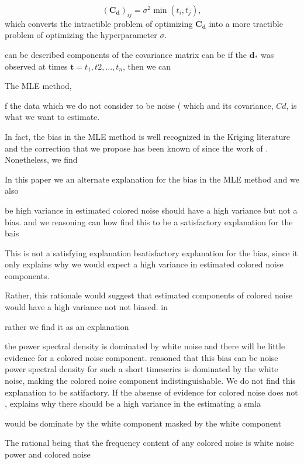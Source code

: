 \documentclass[10pt,a4paper]{article}
\begin{document}
\begin{equation}\label{RandomWalk}
  (\mathbf{C_d})_{ij} = \sigma^2\min(t_i,t_j),
\end{equation}
which converts the intractible problem of optimizing $\mathbf{C_d}$ into a more tractible problem of optimizing the hyperparameter $\sigma$. 

can be described  components of the covariance matrix can be   if the $\mathbf{d_*}$ was observed at times $\mathbf{t} = {t_1,t2,...,t_n}$, then we can      

The MLE method, 

  f the data which we do not consider to be noise ( which     and its covariance, $Cd$, is what we want to estimate.  

In fact, the bias in the MLE method is well recognized in the Kriging literature \citep[e.g][]{Cressie1992} and the correction that we propose has been known of since the work of \citet{Patterson1971}. Nonetheless, we find         

In this paper we an alternate explanation for the bias in the MLE method and we also     

be high variance in estimated colored noise should have a high variance but not a bias.   and we reasoning can how find this to be a satisfactory explanation for the bais

This is not a satisfying explanation bsatisfactory explanation for the bias, since it only explains why we would expect a high variance in estimated colored noise components.

Rather, this rationale would suggest that estimated components of colored noise would have a high variance not not biased. in 

rather we find it as an explanation    

the power spectral density is dominated by white noise and there will be little evidence for a colored noise component.   \citet{Langbein2012} reasoned that this bias can be noise power spectral density for such a short timeseries is dominated by the white noise, making the colored noise component indistinguishable.  We do not find this explanation to be satifactory. If the absense of evidence for colored noise does not ,  explains why there should be a high variance in the  estimating a smla   

   

would be dominate by the white component  masked by the white component   

The rational being that the frequency content of any colored noise is    white noise power and colored noise 
\end{document}
